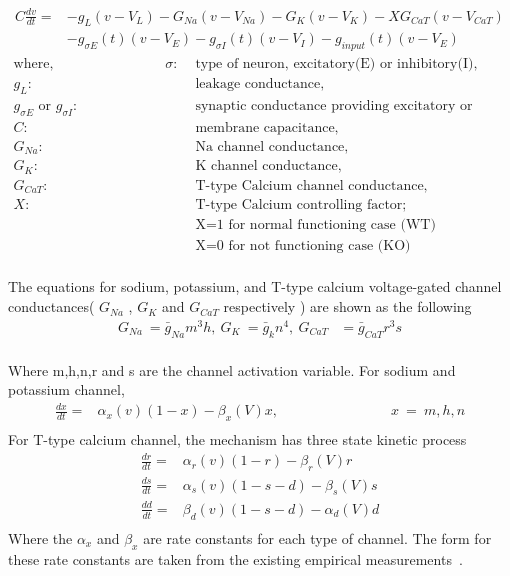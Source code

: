\begin{align*}
C\frac{dv}{dt}=&-g_L(v - V_L) - G_{Na}(v - V_{Na}) - G_K(v - V_K) - XG_{CaT}(v - V_{CaT}) \\
&- g_{\sigma E}(t)(v - V_E) - g_{\sigma I}(t)(v - V_I) - g_{input}(t)(v - V_E)
\end{align*}
\begin{align*}
	\text{where,} \hspace{8em} \sigma :& \text{ type of neuron, excitatory(E) or inhibitory(I),}  \\
	g_L :& \text{ leakage conductance,} \\
	g_{\sigma E} \text{ or } g_{\sigma I} :& \text{ synaptic conductance providing excitatory or inhibitory input} \\
	C :& \text{ membrane capacitance,}\\
	G_{Na} :& \text{ Na channel conductance,}\\
	G_{K} :& \text{ K channel conductance,}\\
	G_{CaT} :& \text{ T-type Calcium channel conductance,}\\
	X :& \text{ T-type Calcium controlling factor;}\\
	   &  \text{ X=1 for normal functioning case (WT) }\\
	   &  \text{ X=0 for not functioning case (KO) }\\
\end{align*}

The equations for sodium, potassium, and T-type calcium voltage-gated channel conductances( $G_{Na}$ , $G_{K}$ and $G_{CaT}$ respectively ) are shown as the following
\begin{align*} 
G_{Na}\ =\bar{g}_{Na}m^{3}h ,\: G_{K}\ =\bar{g}_{k}n^{4},\: G_{CaT}&=\bar{g}_{CaT} r^{3}s\\
\end{align*}

Where m,h,n,r and s are the channel activation variable. 
For sodium and potassium channel,
\begin{align*}
\frac{dx}{dt} =&\alpha_{x}(v)(1-x) - \beta_{x}(V)x, \hspace{8em}  x\ =\ m,h,n \\
\end{align*}
For T-type calcium channel, the mechanism has three state kinetic process
\begin{align*}
\frac{dr}{dt} =& \alpha_{r}(v)(1-r) - \beta_r(V)r \\
\frac{ds}{dt} =& \alpha_{s}(v)(1-s-d) - \beta_{s}(V)s \\
\frac{d d}{dt} =& \beta_{d}(v)(1-s-d) - \alpha_d(V)d \\
\end{align*}
Where the $\alpha_x$ and $\beta_x$ are rate constants for each type of channel. The form for these rate constants are taken from the existing empirical
 measurements~\cite{hodgkin1952quantitative, carnevale2006neuron, wang1991model}.


